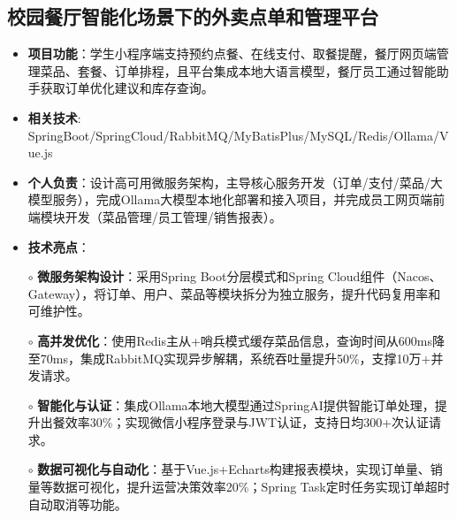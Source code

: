\subsection{\textbf{校园餐厅智能化场景下的外卖点单和管理平台} \hspace{2cm}{2025.01 -- 2025.04}}
    \begin{normalsize}
      \begin{itemize}
        \item \textbf{项目功能}：学生小程序端支持预约点餐、在线支付、取餐提醒，餐厅网页端管理菜品、套餐、订单排程，且平台集成本地大语言模型，餐厅员工通过智能助手获取订单优化建议和库存查询。
        \item \textbf{相关技术}: SpringBoot/SpringCloud/RabbitMQ/MyBatisPlus/MySQL/Redis/Ollama/Vue.js
        \item \textbf{个人负责}：设计高可用微服务架构，主导核心服务开发（订单/支付/菜品/大模型服务），完成Ollama大模型本地化部署和接入项目，并完成员工网页端前端模块开发（菜品管理/员工管理/销售报表）。
        \item \textbf{技术亮点}：
        \setlength{\itemindent}{1em} %
          \item[$\circ$] \textbf{微服务架构设计}：采用Spring Boot分层模式和Spring Cloud组件（Nacos、Gateway），将订单、用户、菜品等模块拆分为独立服务，提升代码复用率和可维护性。
          \item[$\circ$] \textbf{高并发优化}：使用Redis主从+哨兵模式缓存菜品信息，查询时间从600ms降至70ms，集成RabbitMQ实现异步解耦，系统吞吐量提升50\%，支撑10万+并发请求。
          \item[$\circ$] \textbf{智能化与认证}：集成Ollama本地大模型通过SpringAI提供智能订单处理，提升出餐效率30\%；实现微信小程序登录与JWT认证，支持日均300+次认证请求。
          \item[$\circ$] \textbf{数据可视化与自动化}：基于Vue.js+Echarts构建报表模块，实现订单量、销量等数据可视化，提升运营决策效率20\%；Spring Task定时任务实现订单超时自动取消等功能。
        \end{itemize}
    \end{normalsize}